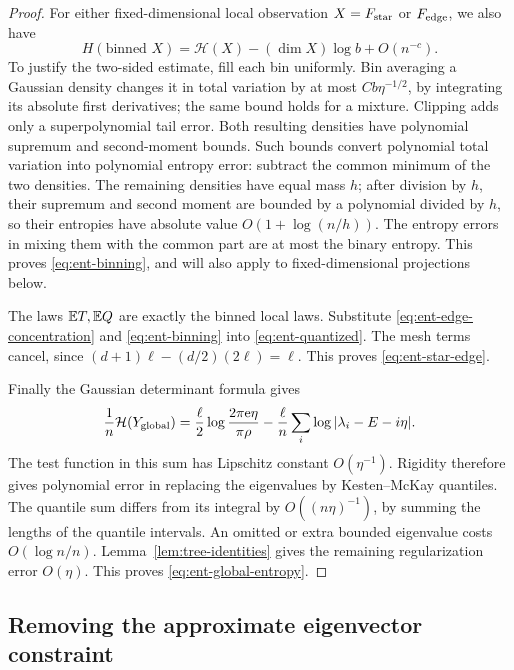\begin{proof}
For either fixed-dimensional local observation \(X=F_{\rm star}\)
or \(F_{\rm edge}\), we also have
\begin{equation}\label{eq:ent-binning}
 H(\text{binned }X)
 =\mathcal H(X)-(\dim X)\log b+O(n^{-c}).
\end{equation}
To justify the two-sided estimate, fill each bin uniformly.
Bin averaging a Gaussian density changes it in total variation by
at most \(Cb\eta^{-1/2}\), by integrating its absolute first
derivatives; the same bound holds for a mixture. Clipping adds only
a superpolynomial tail error. Both resulting densities have
polynomial supremum and second-moment bounds.
Such bounds convert polynomial total variation into polynomial
entropy error: subtract the common minimum of the two densities.
The remaining densities have equal mass \(h\); after division by
\(h\), their supremum and second moment are bounded by a polynomial
divided by \(h\), so their entropies have absolute value
\(O(1+\log(n/h))\). The entropy errors in mixing them with the
common part are at most the binary entropy. This proves
\eqref{eq:ent-binning}, and will also apply to fixed-dimensional
projections below.

The laws \(\mathbb E T,\mathbb E Q\) are exactly the binned local laws.
Substitute \eqref{eq:ent-edge-concentration} and
\eqref{eq:ent-binning} into \eqref{eq:ent-quantized}.
The mesh terms cancel, since
\((d+1)\ell-(d/2)(2\ell)=\ell\).
This proves \eqref{eq:ent-star-edge}.

Finally the Gaussian determinant formula gives
\[
 \frac1n\mathcal H(Y_{\rm global})
 =\frac{\ell}{2}\log\frac{2\pi{\rm e}\eta}{\pi\rho}
       -\frac{\ell}{n}\sum_i\log|\lambda_i-E-i\eta|.
\]
The test function in this sum has Lipschitz constant \(O(\eta^{-1})\).
Rigidity therefore gives polynomial error in replacing the eigenvalues
by Kesten--McKay quantiles. The quantile sum differs from its integral
by \(O((n\eta)^{-1})\), by summing the lengths of the quantile
intervals. An omitted or extra bounded eigenvalue costs
\(O(\log n/n)\). Lemma~\ref{lem:tree-identities} gives the remaining
regularization error \(O(\eta)\). This proves
\eqref{eq:ent-global-entropy}.
\end{proof}

\subsection{Removing the approximate eigenvector constraint}

